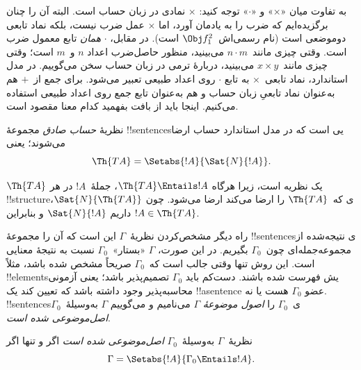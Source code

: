 \documentclass[../../../include/open-logic-section]{subfiles}
\begin{document}
به تفاوت میان «$\times$» و «$\cdot$» توجه کنید: $\times$ نمادی در
زبان حساب است. البته آن را چنان برگزیده‌ایم که ضرب را به یادمان
آورد، اما $\times$ عمل ضرب نیست، بلکه نماد تابعی دوموضعی است (نام
رسمی‌اش~$\Obj f^2_1$ است). در مقابل، $\cdot$ \emph{همان} تابع معمول
ضرب است. وقتی چیزی مانند~$n\cdot m$ می‌بینید، منظور حاصل‌ضرب اعداد
$n$ و~$m$ است؛ وقتی چیزی مانند~$x\times y$ می‌بینید، دربارهٔ ترمی در
زبان حساب سخن می‌گوییم. در مدل استاندارد، نماد تابعی~$\times$ به تابع
$\cdot$ روی اعداد طبیعی تعبیر می‌شود. برای جمع از~$+$ هم به‌عنوان
نماد تابعیِ زبان حساب و هم به‌عنوان تابع جمع روی اعداد طبیعی استفاده
می‌کنیم. اینجا باید از بافت بفهمید کدام معنا مقصود است.

\begin{defn}
نظریهٔ \emph{حساب صادق} مجموعهٔ !!{sentence}sیی است که در مدل استاندارد
حساب ارضا می‌شوند؛ یعنی
\[
\Th{TA} = \Setabs{!A}{\Sat{N}{!A}}.
\]
\end{defn}

$\Th{TA}$ یک نظریه است، زیرا هرگاه $\Th{TA}\Entails !A$، جملهٔ~$!A$
در هر !!{structure}ی که~$\Th{TA}$ را ارضا می‌کند ارضا می‌شود. چون
$\Sat{N}{\Th{TA}}$، داریم $\Sat{N}{!A}$ و بنابراین
$!A\in\Th{TA}$.

راه دیگر مشخص‌کردن نظریهٔ~$\Gamma$ این است که آن را مجموعهٔ
!!{sentence}sی نتیجه‌شده از مجموعه‌جمله‌ای چون~$\Gamma_0$ بگیریم. در
این صورت، $\Gamma$ «بستار»~$\Gamma_0$ نسبت به نتیجهٔ معنایی است. این
روش تنها وقتی جالب است که~$\Gamma_0$ صریحاً مشخص شده باشد، مثلاً
!!{element}sیش فهرست شده باشند. دست‌کم باید $\Gamma_0$ تصمیم‌پذیر باشد؛
یعنی آزمونی محاسبه‌پذیر وجود داشته باشد که تعیین کند یک !!a{sentence} عضو
$\Gamma_0$ هست یا نه. !!{sentence}sی~$\Gamma_0$ را \emph{اصول موضوعهٔ}
$\Gamma$ می‌نامیم و می‌گوییم $\Gamma$ به‌وسیلهٔ~$\Gamma_0$
\emph{اصل‌موضوعی شده است}.

\begin{defn}
نظریهٔ~$\Gamma$ به‌وسیلهٔ~$\Gamma_0$ \emph{اصل‌موضوعی شده است} اگر و
تنها اگر
\[
\Gamma = \Setabs{!A}{\Gamma_0 \Entails !A}.
\]
\end{defn}
\end{document}
